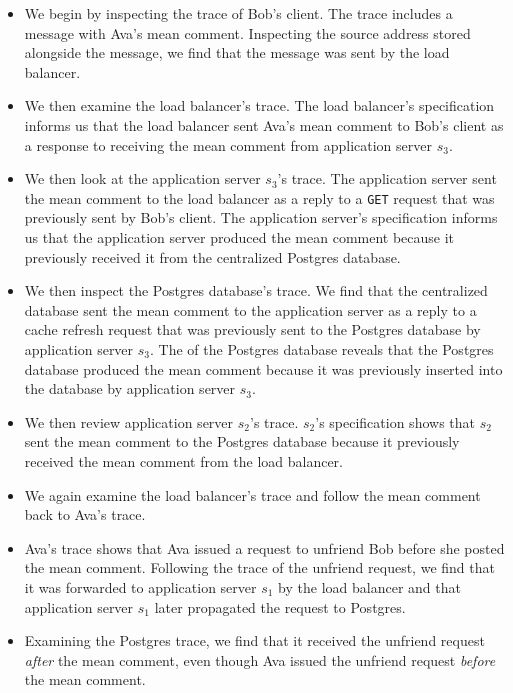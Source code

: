\begin{itemize}
  \item
    We begin by inspecting the trace of Bob's \systemname{} client. The trace
    includes a message with Ava's mean comment. Inspecting the source address
    stored alongside the message, we find that the message was sent by the load
    balancer.
  \item
    We then examine the load balancer's trace. The load balancer's
    \watprovenance{} specification informs us that the load balancer sent Ava's
    mean comment to Bob's \systemname{} client as a response to receiving the
    mean comment from application server $s_3$. 
  \item
    We then look at the application server $s_3$'s trace. The application
    server sent the mean comment to the load balancer as a reply to a
    \texttt{GET} request that was previously sent by Bob's \systemname{}
    client. The application server's \watprovenance{} specification informs us
    that the application server produced the mean comment because it previously
    received it from the centralized Postgres database.
  \item
    We then inspect the Postgres database's trace. We find that the centralized
    database sent the mean comment to the application server as a reply to a
    cache refresh request that was previously sent to the Postgres database by
    application server $s_3$. The \watprovenance{} of the Postgres database
    reveals that the Postgres database produced the mean comment because it was
    previously inserted into the database by application server $s_3$. 
  \item
    We then review application server $s_2$'s trace. $s_2$'s \watprovenance{}
    specification shows that $s_2$ sent the mean comment to the Postgres
    database because it previously received the mean comment from the load
    balancer.
  \item
    We again examine the load balancer's trace and follow the mean comment back
    to Ava's \systemname{} trace.
  \item
    Ava's trace shows that Ava issued a request to unfriend Bob before she
    posted the mean comment. Following the trace of the unfriend request, we
    find that it was forwarded to application server $s_1$ by the load
    balancer and that application server $s_1$ later propagated the request to
    Postgres.
  \item
    Examining the Postgres trace, we find that it received the unfriend request
    \emph{after} the mean comment, even though Ava issued the unfriend request
    \emph{before} the mean comment.
\end{itemize}

